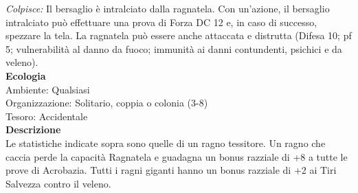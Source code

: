 \begin{multicols}{2}
\emph{Colpisce:} Il bersaglio è intralciato dalla ragnatela. Con un'azione, il bersaglio intralciato può effettuare una prova di Forza DC 12 e, in caso di successo, spezzare la tela. La ragnatela può essere anche attaccata e distrutta (Difesa 10; pf 5; vulnerabilità al danno da fuoco; immunità ai danni contundenti, psichici e da veleno).\\
\textbf{Ecologia}\\
Ambiente: Qualsiasi\\
Organizzazione: Solitario, coppia o colonia (3-8)\\
Tesoro: Accidentale\\
\textbf{Descrizione}\\
Le statistiche indicate sopra sono quelle di un ragno tessitore. Un ragno che caccia perde la capacità Ragnatela e guadagna un bonus razziale di +8 a tutte le prove di Acrobazia. Tutti i ragni giganti hanno un bonus razziale di +2 ai Tiri Salvezza contro il veleno.\\


\end{multicols}

